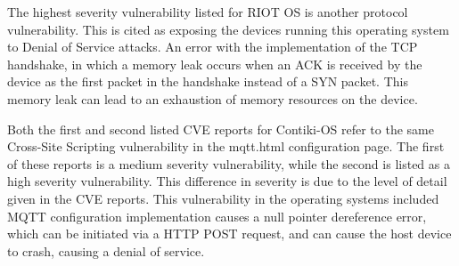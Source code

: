 The highest severity vulnerability listed for RIOT OS is another protocol
vulnerability. This is cited as exposing the devices running this operating
system to Denial of Service attacks. An error with the implementation of the TCP
handshake, in which a memory leak occurs when an ACK is received by the device
as the first packet in the handshake instead of a SYN packet\cite{riotCve3}. This memory leak
can lead to an exhaustion of memory resources on the device.


Both the first and second  listed CVE reports for Contiki-OS refer to the same
Cross-Site Scripting vulnerability in the mqtt.html configuration page. The
first of these reports is a medium severity vulnerability\cite{contikiCve1},
while the second is listed as a high severity vulnerability\cite{contikiCve2}.
This difference in severity is due to the level of detail given in the CVE
reports. This vulnerability in the operating systems included MQTT configuration
implementation causes a null pointer dereference error, which can be initiated
via a HTTP POST request, and can cause the host device to crash, causing a denial of
service\cite{contikiMqtt}.


